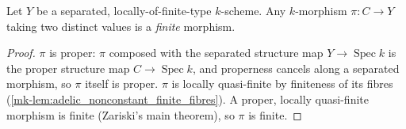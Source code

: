 \begin{proposition}
  \label{mk-thm:adelic_nonconstant_map_isFinite}
  \leanok
  Let \(Y\) be a separated, locally-of-finite-type \(k\)-scheme. Any
  \(k\)-morphism \(\pi \colon C \to Y\) taking two distinct values is a
  \emph{finite} morphism.
\end{proposition}
\begin{proof}
  \leanok
  \(\pi\) is proper: \(\pi\) composed with the separated structure map
  \(Y \to \operatorname{Spec} k\) is the proper structure map
  \(C \to \operatorname{Spec} k\), and properness cancels along a
  separated morphism, so \(\pi\) itself is proper.
  \(\pi\) is locally quasi-finite by finiteness of its fibres
  (\ref{mk-lem:adelic_nonconstant_finite_fibres}). A proper, locally
  quasi-finite morphism is finite (Zariski's main theorem), so \(\pi\)
  is finite.
\end{proof}


